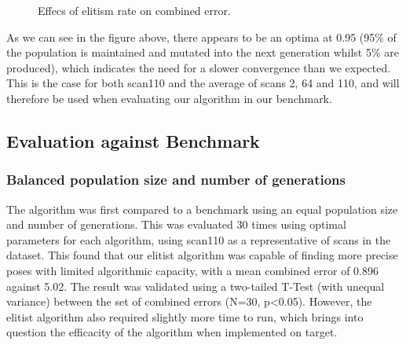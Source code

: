 \documentclass[authoryearcitations]{UoYCSproject}
\begin{document}
\begin{figure}
	\centering
	\caption[Optimsing elitism rate for scan/map]{Effecs of elitism rate on combined error.}
	\label{fig:elitsm_rates}
\end{figure}
As we can see in the figure above, there appears to be an optima at 0.95 (95\% of the population is maintained and mutated into the next generation whilst 5\% are produced), which indicates the need for a slower convergence than we expected. This is the case for both scan110 and the average of scans 2, 64 and 110, and will therefore be used when evaluating our algorithm in our benchmark.


\subsection{Evaluation against Benchmark}
\subsubsection{Balanced population size and number of generations}
\label{subsec:ga_vs_elite_eq_pop_gen}
The algorithm was first compared to a benchmark using an equal population size and number of generations. This was evaluated 30 times using optimal parameters for each algorithm, using scan110 as a representative of scans in the dataset. This found that our elitist algorithm was capable of finding more precise poses with limited algorithmic capacity, with a mean combined error of 0.896 against 5.02. The result was validated using a two-tailed T-Test (with unequal variance) between the set of combined errors (N=30, p<0.05). However, the elitist algorithm also required slightly more time to run, which brings into question the efficacity of the algorithm when implemented on target.
\end{document}
